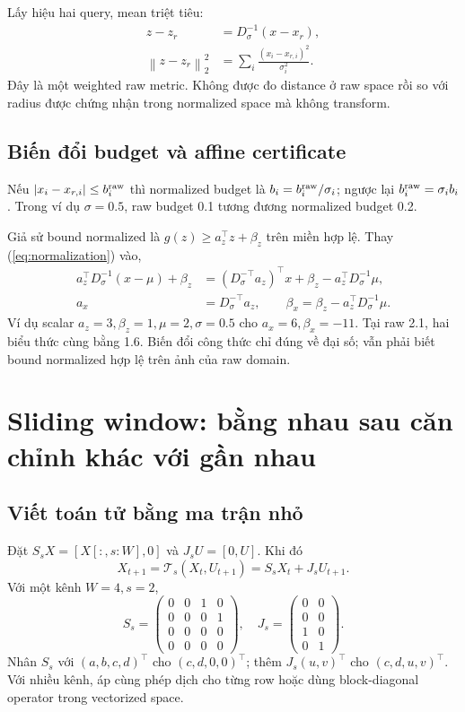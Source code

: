 \documentclass[11pt,a4paper]{article}
\newcommand{\norm}[1]{\left\lVert#1\right\rVert}
\theoremstyle{definition}
\begin{document}
Lấy hiệu hai query, mean triệt tiêu:
\begin{align}
z-z_r&=D_\sigma^{-1}(x-x_r),\\
\norm{z-z_r}_2^2&=\sum_i\frac{(x_i-x_{r,i})^2}{\sigma_i^2}.
\end{align}
Đây là một weighted raw metric. Không được đo distance ở raw space rồi
so với radius được chứng nhận trong normalized space mà không transform.

\subsection{Biến đổi budget và affine certificate}
Nếu $|x_i-x_{r,i}|\le b_i^{\rm raw}$ thì normalized budget là
$b_i=b_i^{\rm raw}/\sigma_i$; ngược lại $b_i^{\rm raw}=\sigma_i b_i$.
Trong ví dụ $\sigma=0.5$, raw budget 0.1 tương đương normalized budget 0.2.

Giả sử bound normalized là $g(z)\ge a_z^\top z+\beta_z$ trên miền hợp lệ.
Thay (\ref{eq:normalization}) vào,
\begin{align}
a_z^\top D_\sigma^{-1}(x-\mu)+\beta_z
&=(D_\sigma^{-\top}a_z)^\top x
+\beta_z-a_z^\top D_\sigma^{-1}\mu,\\
a_x&=D_\sigma^{-\top}a_z,\qquad
\beta_x=\beta_z-a_z^\top D_\sigma^{-1}\mu.
\end{align}
Ví dụ scalar $a_z=3,\beta_z=1,\mu=2,\sigma=0.5$ cho $a_x=6,\beta_x=-11$.
Tại raw 2.1, hai biểu thức cùng bằng 1.6. Biến đổi công thức chỉ đúng về
đại số; vẫn phải biết bound normalized hợp lệ trên ảnh của raw domain.

\section{Sliding window: bằng nhau sau căn chỉnh khác với gần nhau}
\subsection{Viết toán tử bằng ma trận nhỏ}
Đặt $S_sX=[X[:,s:W],0]$ và $J_sU=[0,U]$. Khi đó
\begin{equation}
X_{t+1}=\mathcal T_s(X_t,U_{t+1})=S_sX_t+J_sU_{t+1}.
\end{equation}
Với một kênh $W=4,s=2$,
\begin{equation}
S_s=\begin{pmatrix}0&0&1&0\\0&0&0&1\\0&0&0&0\\0&0&0&0\end{pmatrix},\quad
J_s=\begin{pmatrix}0&0\\0&0\\1&0\\0&1\end{pmatrix}.
\end{equation}
Nhân $S_s$ với $(a,b,c,d)^\top$ cho $(c,d,0,0)^\top$; thêm
$J_s(u,v)^\top$ cho $(c,d,u,v)^\top$. Với nhiều kênh, áp cùng phép dịch
cho từng row hoặc dùng block-diagonal operator trong vectorized space.
\end{document}
